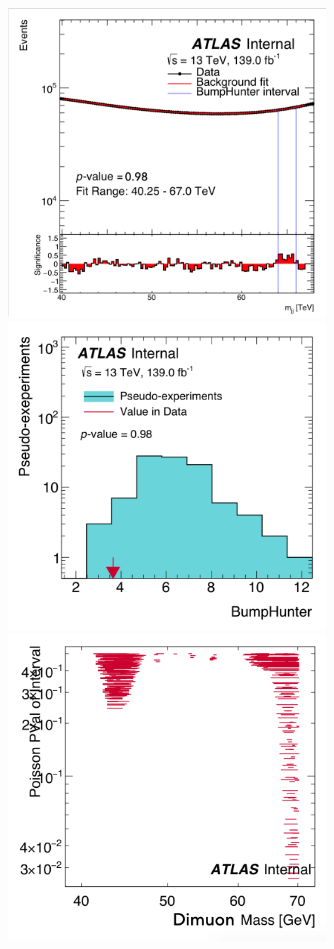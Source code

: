 \begin{figure}[!htb]
    \begin{center}
        \includegraphics[width=0.75\textwidth]{figures/chapter_dimuon/Nominal}        
        \includegraphics[width=0.75\textwidth]{figures/chapter_dimuon/NominalBH}        
        \includegraphics[width=0.75\textwidth]{figures/chapter_dimuon/NominalFit}        

\end{center}
\end{figure}
